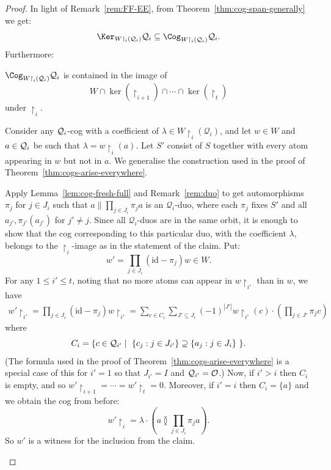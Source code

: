 \begin{proof}
In light of Remark~\ref{rem:FF-EE}, from Theorem~\ref{thm:cog-span-generally} we get: 
\[\Ker_{W {\restriction_{i}} (\mathcal{Q}_{i})} \mathcal{Q}_{i} \subseteq \Cog_{W {\restriction_{i}} (\mathcal{Q}_{i})} \mathcal{Q}_{i}.\]
Furthermore:
\begin{claim}\label{claim:cogs-arise-everywhere}
    $\Cog_{W {\restriction}_{i} (\mathcal{Q}_{i})} \mathcal{Q}_{i}$ is contained in
    the image of \[
        W \cap \ker(\restriction_{i+1}) \cap \cdots \cap \ker(\restriction_t)
    \] under $\restriction_{i}$. 
\end{claim}
\begin{claimproof}
    Consider any ${\cal Q}_i$-cog with a coefficient of $\lambda\in W {\restriction_{i}} (\mathcal{Q}_{i})$, and let $w\in W$ and $a\in{\cal Q}_i$ be such that $\lambda = w{\restriction_{i}}(a)$.
    Let $S'$ consist of $S$ together with every atom appearing in $w$ but not in $a$.
    We generalise the construction used in the proof of Theorem~\ref{thm:cogs-arise-everywhere}.
    
    Apply Lemma~\ref{lem:cog-fresh-full} and Remark~\ref{rem:duo} to get automorphisms $\pi_j$ for $j \in J_i$ 
    such that $a \parallel \prod_{j \in J_i} \pi_j a$ is an $\mathcal{Q}_i$-duo, 
    where each $\pi_j$ fixes $S'$ and all $a_{j'}, \pi_{j'}(a_{j'})$ for $j'\neq j$. 
    Since all $\mathcal{Q}_i$-duos are in the same orbit, it is enough to show that 
    the cog corresponding to this particular duo, with the coefficient $\lambda$, 
    belongs to the $\restriction_i$-image as in the statement of the claim.
    Put: \[
        w' = \prod_{j \in J_{i}} (\mathrm{id} - \pi_j) w \in W.
    \]
    For any $1 \leq i' \leq t$, noting that no more atoms can appear in $w{\restriction_{i'}}$ than in $w$, we have
    \begin{align*}
        w' {\restriction_{i'}}
        = \prod_{j \in J_{i}} (\mathrm{id} - \pi_j) w {\restriction_{i'}} 
        = \sum_{c \in C_i} \sum_{J' \subseteq J_i} (-1)^{|J'|}  
            w {\restriction_{i'}}(c) \cdot \left(\prod_{j \in J'} \pi_j c\right)
    \end{align*}
    where \[
        C_i = \{ c\in{\cal Q}_{i'} \mid\ 
            \{c_j : j\in J_{i'}\} \supseteq \{a_j : j\in J_i\} 
        \ \}.
    \]
    (The formula used in the proof of Theorem~\ref{thm:cogs-arise-everywhere} is a special case of this for $i'=1$ so that $J_{i'}=I$ and ${\cal Q}_{i'}={\cal O}$.) Now, if $i'>i$ then $C_i$ is empty, and so $w' {\restriction_{i+1}} = \cdots = w' {\restriction_{t}} = 0$. Moreover, if $i'=i$ then $C_i = \{a\}$ and we obtain the cog from before:
    \[
        w' {\restriction_{i}} = \lambda \cdot \left(a \between \prod_{j \in J_{i}} \pi_j a\right).
    \]
So $w'$ is a witness for the inclusion from the claim.
\end{claimproof}


\end{proof}
